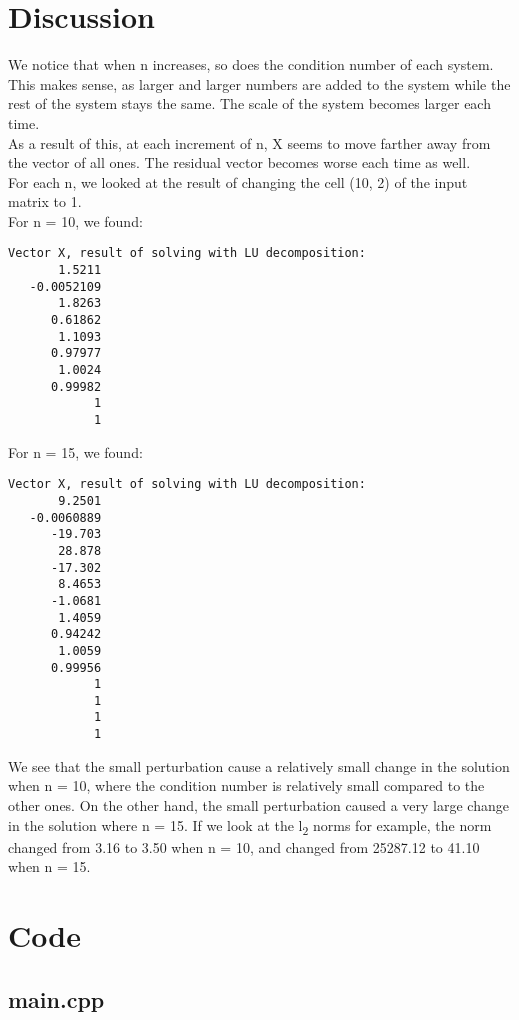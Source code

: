 \newpage
\section{Discussion}
We notice that when n increases, so does the condition number of each system.
This makes sense, as larger and larger numbers are added to the system while the rest of the system stays the same.
The scale of the system becomes larger each time.\\
As a result of this, at each increment of n, X seems to move farther away from the vector of all ones. The residual vector becomes worse each time as well.\\

For each n, we looked at the result of changing the cell (10, 2) of the input matrix to 1. \\
For n = 10, we found:
\begin{lstlisting}
Vector X, result of solving with LU decomposition:
       1.5211
   -0.0052109
       1.8263
      0.61862
       1.1093
      0.97977
       1.0024
      0.99982
            1
            1
\end{lstlisting}

For n = 15, we found:
\begin{lstlisting}
Vector X, result of solving with LU decomposition:
       9.2501
   -0.0060889
      -19.703
       28.878
      -17.302
       8.4653
      -1.0681
       1.4059
      0.94242
       1.0059
      0.99956
            1
            1
            1
            1
\end{lstlisting}

We see that the small perturbation cause a relatively small change in the solution when n = 10, where the condition number is relatively small compared to the other ones.
On the other hand, the small perturbation caused a very large change in the solution where n = 15.
If we look at the l\textsubscript{2} norms for example, the norm changed from 3.16 to 3.50 when n = 10, and changed from 25287.12 to 41.10 when n = 15.

\onecolumn
\appendix
\appendixpage
\addappheadtotoc

\section{Code}
	\subsection{main.cpp}
		 
	\bigskip
